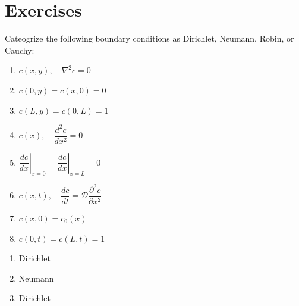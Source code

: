 \section{Exercises}

\begin{exercise} %
    Cateogrize the following boundary conditions as Dirichlet, Neumann, Robin, or Cauchy:
    \begin{enumerate}[label=(\alph*)]
        \item $c(x,y),\quad \nabla^2 c = 0$
        \item[] $c(0,y) = c(x,0)=0$
        \item[] $c(L,y) = c(0,L)=1$
        \item $c(x),\quad \dfrac{d^2c}{dx^2}=0$
        \item[] $\left.\dfrac{dc}{dx}\right|_{x=0} = \left.\dfrac{dc}{dx}\right|_{x=L} = 0$
        \item $c(x,t),\quad \dfrac{dc}{dt} = \mathcal{D} \dfrac{\partial^2c}{\partial x^2}$
        \item[] $c(x,0)=c_0(x)$
        \item[] $c(0,t)=c(L,t)=1$
    \end{enumerate}
\end{exercise}

\begin{solution}
    \begin{enumerate}[label=(\alph*)]
        \item Dirichlet
        \item Neumann
        \item Dirichlet
    \end{enumerate}
\end{solution}


